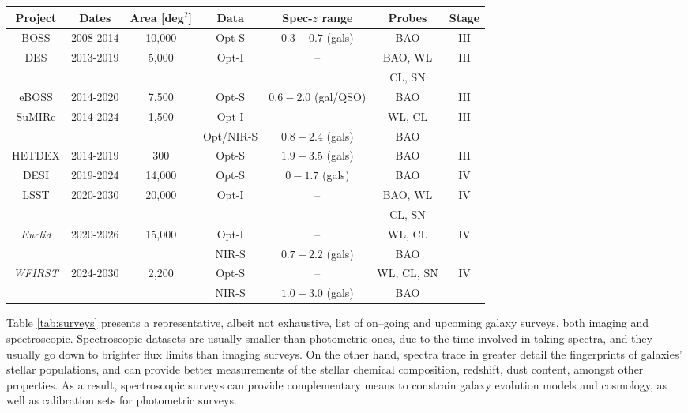 \begin{sidewaystable}
 \centering 
 \begin{tabular}{ccccccc}
  \hline
  \hline
  Project&Dates&Area [deg$^2$]&Data & Spec-$z$ range & Probes &Stage \\
  \hline
BOSS & 2008-2014 &10,000 & Opt-S & $0.3-0.7$ (gals) &BAO & III\\
DES & 2013-2019 &5,000 & Opt-I & -- &BAO, WL & III\\
&&&&&CL, SN &\\ 
eBOSS & 2014-2020 &7,500 & Opt-S & $0.6-2.0$ (gal/QSO) &BAO& III\\
SuMIRe & 2014-2024 &1,500 & Opt-I & -- &WL, CL & III\\
&&& Opt/NIR-S & $0.8-2.4$ (gals) &BAO&\\
HETDEX & 2014-2019 &300 & Opt-S & $1.9-3.5$ (gals) &BAO& III\\
DESI & 2019-2024 &14,000 & Opt-S & $0-1.7$ (gals) &BAO& IV\\
LSST & 2020-2030 &20,000 & Opt-I & -- &BAO, WL& IV\\
&&&&& CL, SN&\\
\emph{Euclid} & 2020-2026 &15,000 & Opt-I & -- &WL, CL& IV\\
&&&NIR-S& $0.7-2.2$ (gals) &BAO&\\
\emph{WFIRST} & 2024-2030 &2,200 & Opt-S & -- &WL, CL, SN& IV\\
&&&NIR-S& $1.0-3.0$ (gals) &BAO&\\

\hline
 \end{tabular}
\caption{A selection of major recent, on--going and future dark energy experiments. Abbreviations in the ``Data'' column refer to optical (Opt) or near-infrared (NIR) imaging (I) or spectroscopy (S). For spectroscopic experiments, the ``Spec-$z$'' column lists the primary redshift range for galaxies (gals), quasars (QSOs). %
Abbreviations in the ``Methods'' column are weak lensing (WL), clusters (CL), supernovae (SN) and baryon acoustic oscillations (BAO). %
Adapted from \citet{weinbergrev}.}\label{tab:surveys}
\end{sidewaystable}

Table \ref{tab:surveys} presents a representative, albeit not exhaustive, list of on--going and upcoming galaxy surveys, both imaging and spectroscopic. Spectroscopic datasets are usually smaller than photometric ones, due to the time involved in taking spectra, and they usually go down to brighter flux limits than imaging surveys. On the other hand, spectra trace in greater detail the fingerprints of galaxies' stellar populations, and can provide better measurements of the stellar chemical composition, redshift, dust content, amongst other properties. As a result, spectroscopic surveys can provide complementary means to constrain galaxy evolution models and cosmology, as well as calibration sets for photometric surveys.

